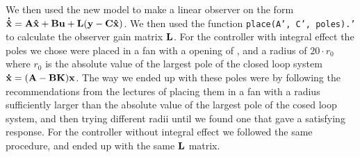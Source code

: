 We then used the new model to make a linear observer on the form $\mathbf{\dot{\hat x}} = \mathbf{A}\mathbf{\hat x} + \mathbf{B}\mathbf{u} + \mathbf{L} (\mathbf{y}-\mathbf{C}\mathbf{\hat x})$. We then used the function \texttt{place(A', C', poles).'} to calculate the observer gain matrix $\mathbf{L}$. For the controller with integral effect the poles we chose were placed in a fan with a opening of , and a radius of $20 \cdot r_0$ where $r_0$ is the absolute value of the largest pole of the closed loop system $\mathbf{\dot x} = (\mathbf{A} - \mathbf{B} \mathbf{K}) \mathbf{x}$. The way we ended up with these poles were by following the recommendations from the lectures of placing them in a fan with a radius sufficiently larger than the absolute value of the largest pole of the cosed loop system, and then trying different radii until we found one that gave a satisfying response. For the controller without integral effect we followed the same procedure, and ended up with the same $\mathbf{L}$ matrix.  

